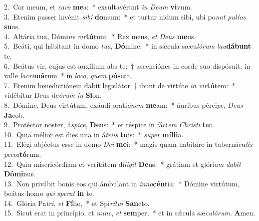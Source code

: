 {2.~}Cor meum, et \textit{ca}\textit{ro} \textbf{me}a:~* exsultavérunt \textit{in} \textit{De}\textit{um} \textbf{vi}vum.\\
{3.~}Etenim passer invénit \textit{si}\textit{bi} \textbf{do}mum:~* et turtur nidum sibi, ubi po\textit{nat} \textit{pul}\textit{los} \textbf{su}os.\\
{4.~}Altária tua, Dómi\textit{ne} \textit{vir}\textbf{tú}tum:~* Rex meus, \textit{et} \textit{De}\textit{us} \textbf{me}us.\\
{5.~}Beáti, qui hábitant in domo \textit{tu}\textit{a}, \textbf{Dó}mine:~* in sǽcula sæcu\textit{ló}\textit{rum} \textit{lau}\textbf{dá}\textbf{bunt} te.\\
{6.~}Beátus vir, cujus est auxílium abs te:~† ascensiónes in corde suo dispósuit, in valle \textit{la}\textit{cri}\textbf{má}rum~* in \textit{lo}\textit{co}, \textit{quem} \textbf{pó}\textbf{su}it.\\
{7.~}Etenim benedictiónem dabit legislátor~† ibunt de virtúte \textit{in} \textit{vir}\textbf{tú}tem:~* vidébitur Deus de\textit{ó}\textit{rum} \textit{in} \textbf{Si}on.\\
{8.~}Dómine, Deus virtútum, exáudi orati\textit{ó}\textit{nem} \textbf{me}am:~* áuribus pérci\textit{pe}, \textit{De}\textit{us} \textbf{Ja}cob.\\
{9.~}Protéctor noster, á\textit{spi}\textit{ce}, \textbf{De}us:~* et réspice in fáci\textit{em} \textit{Chri}\textit{sti} \textbf{tu}i.\\
{10.~}Quia mélior est dies una in á\textit{tri}\textit{is} \textbf{tu}is:~* \textit{su}\textit{per} \textbf{míl}\textbf{li}a.\\
{11.~}Elégi abjéctus esse in domo \textit{De}\textit{i} \textbf{me}i:~* magis quam habitáre in tabernácu\textit{lis} \textit{pec}\textit{ca}\textbf{tó}rum.\\
{12.~}Quia misericórdiam et veritátem dí\textit{li}\textit{git} \textbf{De}us:~* grátiam et glóri\textit{am} \textit{da}\textit{bit} \textbf{Dó}\textbf{mi}nus.\\
{13.~}Non privábit bonis eos qui ámbulant in \textit{in}\textit{no}\textbf{cén}tia:~* Dómine virtútum, beátus homo \textit{qui} \textit{spe}\textit{rat} \textbf{in} te.\\
{14.~}Glória Pa\textit{tri}, \textit{et} \textbf{Fí}lio,~* et Spi\textit{rí}\textit{tu}\textit{i} \textbf{San}cto.\\
{15.~}Sicut erat in princípio, et \textit{nunc}, \textit{et} \textbf{sem}per,~* et in sǽcula sæ\textit{cu}\textit{ló}\textit{rum}. \textbf{A}men.\\
